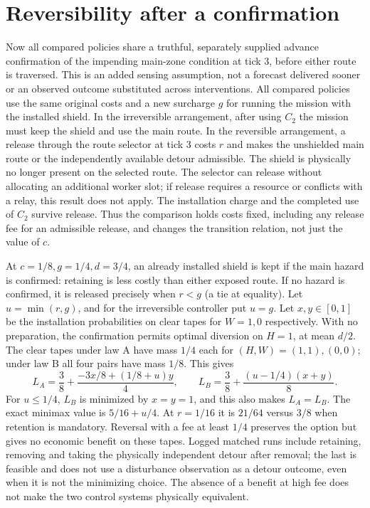 \documentclass[11pt]{article}
\begin{document}
\section{Reversibility after a confirmation}
Now all compared policies share a truthful, separately supplied advance
confirmation of the impending main-zone condition at tick 3, before
either route is traversed. This is an added sensing assumption, not a
forecast delivered sooner or an observed outcome substituted across
interventions. All compared policies use the same original costs and a
new surcharge $g$ for running the mission with the installed shield.
In the irreversible arrangement, after using $C_2$ the mission must keep
the shield and use the main route. In the reversible arrangement,
a release through the route selector at tick 3 costs $r$ and makes the
unshielded main route or the independently available detour admissible.
The shield is physically no longer present on the selected route.
The selector can release without allocating an additional worker slot;
if release requires a resource or conflicts with a relay, this result
does not apply. The installation charge and the completed use of $C_2$
survive release. Thus the comparison holds costs fixed, including any
release fee for an admissible release, and changes the transition
relation, not just the value of $c$.

At $c=1/8,g=1/4,d=3/4$, an already installed shield is kept if the
main hazard is confirmed: retaining is less costly than either exposed
route. If no hazard is confirmed, it is released precisely when
$r<g$ (a tie at equality). Let $u=\min(r,g)$, and for the irreversible
controller put $u=g$. Let $x,y\in[0,1]$ be the installation probabilities
on clear tapes for $W=1,0$ respectively. With no preparation, the
confirmation permits optimal diversion on $H=1$, at mean $d/2$.
The clear tapes under law A have mass $1/4$ each for $(H,W)=(1,1),(0,0)$;
under law B all four pairs have mass $1/8$. This gives
\[
 L_A=\frac38+\frac{-3x/8+(1/8+u)y}{4},\qquad
 L_B=\frac38+\frac{(u-1/4)(x+y)}8 .
\]
For $u\le1/4$, $L_B$ is minimized by $x=y=1$, and this also makes
$L_A=L_B$. The exact minimax value is $5/16+u/4$. At $r=1/16$ it
is $21/64$ versus $3/8$ when retention is mandatory. Reversal with a fee
at least $1/4$ preserves the option but gives no economic benefit on
these tapes. Logged matched runs include retaining, removing and taking
the physically independent detour after removal; the last is feasible
and does not use a disturbance observation as a detour outcome, even
when it is not the minimizing choice. The absence of a benefit at high
fee does not make the two control systems physically equivalent.
\end{document}
